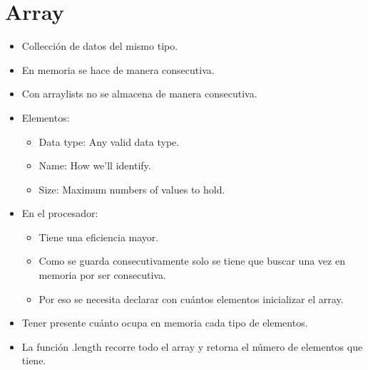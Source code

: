 \section{Array}
\begin{itemize}
    \item Collección de datos del mismo tipo.
    \item En memoria se hace de manera consecutiva.
    \item Con arraylists no se almacena de manera consecutiva.
    \item Elementos:
        \begin{itemize}
            \item Data type: Any valid data type.
            \item Name: How we'll identify.
            \item Size: Maximum numbers of values to hold.
        \end{itemize}
    
    \item En el procesador:
        \begin{itemize}
            \item Tiene una eficiencia mayor.
            \item Como se guarda consecutivamente solo se tiene que buscar una vez en memoria por ser consecutiva.
            \item Por eso se necesita declarar con cuántos elementos inicializar el array.
        \end{itemize}
    
    \item Tener presente cuánto ocupa en memoria cada tipo de elementos.
    \item La función .length recorre todo el array y retorna el número de elementos que tiene.
\end{itemize}



